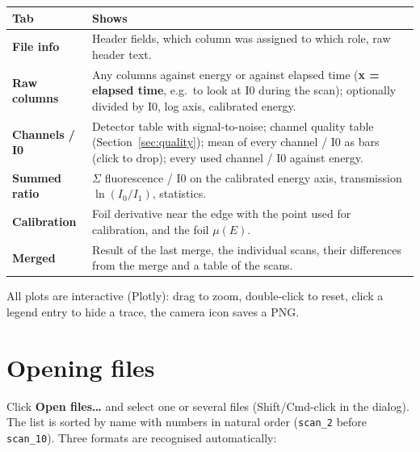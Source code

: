 \documentclass[11pt,a4paper]{article}
\newcommand{\ui}[1]{\textsf{\textbf{#1}}}          %
\newcommand{\file}[1]{\texttt{#1}}
\begin{document}
\begin{center}
\begin{tabularx}{\linewidth}{@{}lX@{}}
\toprule
Tab & Shows \\
\midrule
\ui{File info}      & Header fields, which column was assigned to which role, raw header text. \\
\ui{Raw columns}    & Any columns against energy or against elapsed time (\ui{x = elapsed time}, e.g.\ to look
                      at I0 during the scan); optionally divided by I0, log axis, calibrated energy. \\
\ui{Channels / I0}  & Detector table with signal-to-noise; channel quality table (Section~\ref{sec:quality});
                      mean of every channel / I0 as bars (click to drop);
                      every used channel / I0 against energy. \\
\ui{Summed ratio}   & $\Sigma$ fluorescence / I0 on the calibrated energy axis, transmission $\ln(I_0/I_1)$,
                      statistics. \\
\ui{Calibration}    & Foil derivative near the edge with the point used for calibration, and the foil
                      $\mu(E)$. \\
\ui{Merged}         & Result of the last merge, the individual scans, their differences from the merge and a
                      table of the scans. \\
\bottomrule
\end{tabularx}
\end{center}

All plots are interactive (Plotly): drag to zoom, double-click to reset, click a
legend entry to hide a trace, the camera icon saves a PNG.

\section{Opening files}
Click \ui{Open files\ldots} and select one or several files (Shift/Cmd-click in the
dialog). The list is sorted by name with numbers in natural order
(\file{scan\_2} before \file{scan\_10}). Three formats are recognised automatically:
\end{document}
